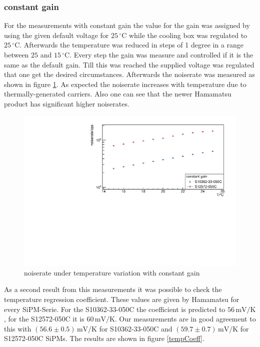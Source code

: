 \subsubsection{constant gain}
For the measurements with constant gain the value for the gain was assigned by using the given default voltage for $25\,\mathrm{^{\circ}C}$ while the cooling box was regulated to $25\,\mathrm{^{\circ}C}$. Afterwards the temperature was reduced in steps of 1 degree in a range between $25$ and $15\,\mathrm{^{\circ}C}$. Every step the gain was measure and controlled if it is the same as the default gain. Till this was reached the supplied voltage was regulated that one get the desired circumstances. Afterwards the noiserate was measured as shown in figure \ref{constGain_rate}.
As expected the noiserate increases with temperature due to thermally-generated carriers. Also one can see that the newer Hamamatsu product has significant higher noiserates.
\begin{figure}[h]
	\centering
	\includegraphics[width = 0.75 \textwidth]{Figures/radermacher/constGain_Rate.pdf}
	\caption{noiserate under temperature variation with constant gain}
	\label{constGain_rate}
\end{figure}
As a second result from this measurements it was possible to check the temperature regression coefficient. These values are given by Hamamatsu for every SiPM-Serie. For the S10362-33-050C the coefficient is predicted to $56\,\mathrm{mV/K}$, for the S12572-050C it is $60\,\mathrm{mV/K}$. Our measurements are in good agreement to this with $(56.6 \pm 0.5)\,\mathrm{mV/K}$ for S10362-33-050C and $(59.7 \pm 0.7)\,\mathrm{mV/K}$ for S12572-050C SiPMs. The results are shown in figure \ref{tempCoeff}. 
